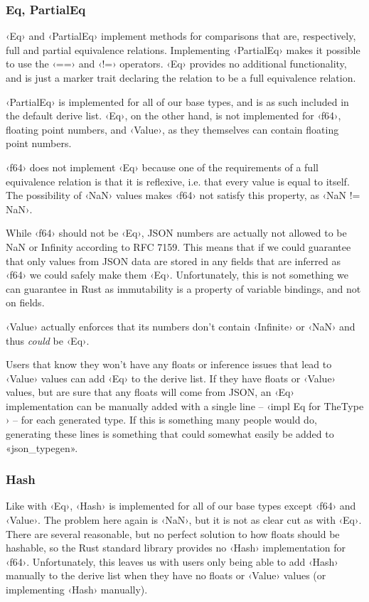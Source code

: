 \subsubsection{Eq, PartialEq}

‹Eq› and ‹PartialEq› implement methods for comparisons that are, respectively, full and partial equivalence relations. Implementing ‹PartialEq› makes it possible to use the ‹==› and ‹!=› operators. ‹Eq› provides no additional functionality, and is just a marker trait declaring the relation to be a full equivalence relation.

‹PartialEq› is implemented for all of our base types, and is as such included in the default derive list. ‹Eq›, on the other hand, is not implemented for ‹f64›, floating point numbers, and ‹Value›, as they themselves can contain floating point numbers.

‹f64› does not implement ‹Eq› because one of the requirements of a full equivalence relation is that it is reflexive, i.e. that every value is equal to itself. The possibility of ‹NaN› values makes ‹f64› not satisfy this property, as ‹NaN != NaN›.

While ‹f64› should not be ‹Eq›, JSON numbers are actually not allowed to be NaN or Infinity according to RFC 7159\cite[7]{RFC7159}. This means that if we could guarantee that only values from JSON data are stored in any fields that are inferred as ‹f64› we could safely make them ‹Eq›. Unfortunately, this is not something we can guarantee in Rust as immutability is a property of variable bindings, and not on fields.

‹Value› actually enforces that its numbers don't contain ‹Infinite› or ‹NaN› and thus \emph{could} be ‹Eq›.

Users that know they won't have any floats or inference issues that lead to ‹Value› values can add ‹Eq› to the derive list. If they have floats or ‹Value› values, but are sure that any floats will come from JSON, an ‹Eq› implementation can be manually added with a single line -- ‹impl Eq for TheType {}› -- for each generated type. If this is something many people would do, generating these lines is something that could somewhat easily be added to «json_typegen».

\subsubsection{Hash}

Like with ‹Eq›, ‹Hash› is implemented for all of our base types except ‹f64› and ‹Value›. The problem here again is ‹NaN›, but it is not as clear cut as with ‹Eq›. There are several reasonable, but no perfect solution to how floats should be hashable, so the Rust standard library provides no ‹Hash› implementation for ‹f64›. Unfortunately, this leaves us with users only being able to add ‹Hash› manually to the derive list when they have no floats or ‹Value› values (or implementing ‹Hash› manually).

